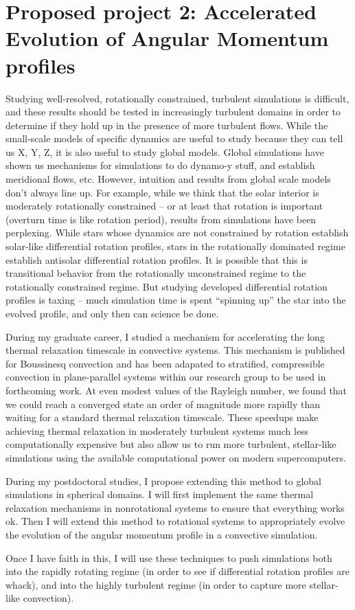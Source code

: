 \documentclass[aasms,12pt]{article}
\begin{document}
\section{Proposed project 2: Accelerated Evolution of Angular Momentum profiles}
\label{sct:global_models}
Studying well-resolved, rotationally constrained, turbulent simulations is difficult, and these results should be tested in increasingly turbulent domains in order to determine if they hold up in the presence of more turbulent flows.
While the small-scale models of specific dynamics are useful to study because they can tell us X, Y, Z, it is also useful to study global models.
Global simulations have shown us mechanisms for simulations to do dynamo-y stuff, and establish meridional flows, etc.
However, intuition and results from global scale models don't always line up.
For example, while we think that the solar interior is moderately rotationally constrained -- or at least that rotation is important (overturn time is like rotation period), results from simulations have been perplexing.
While stars whose dynamics are not constrained by rotation establish solar-like differential rotation profiles, stars in the rotationally dominated regime establish antisolar differential rotation profiles.
It is possible that this is transitional behavior from the rotationally unconstrained regime to the rotationally constrained regime.
But studying developed differential rotation profiles is taxing -- much simulation time is spent ``spinning up'' the star into the evolved profile, and only then can science be done.

During my graduate career, I studied a mechanism for accelerating the long thermal relaxation timescale in convective systems.
This mechanism is published for Boussinesq convection and has been adapated to stratified, compressible convection in plane-parallel systems within our research group to be used in forthcoming work.
At even modest values of the Rayleigh number, we found that we could reach a converged state an order of magnitude more rapidly than waiting for a standard thermal relaxation timescale.
These speedups make achieving thermal relaxation in moderately turbulent systems much less computationally expensive but also allow us to run more turbulent, stellar-like simulations using the available computational power on modern supercomputers.

During my postdoctoral studies, I propose extending this method to global simulations in spherical domains.
I will first implement the same thermal relaxation mechanisms in nonrotational systems to ensure that everything works ok.
Then I will extend this method to rotational systems to appropriately evolve the evolution of the angular momentum profile in a convective simulation.

Once I have faith in this, I will use these techniques to push simulations both into the rapidly rotating regime (in order to see if differential rotation profiles are whack), and into the highly turbulent regime (in order to capture more stellar-like convection).






\end{document}
